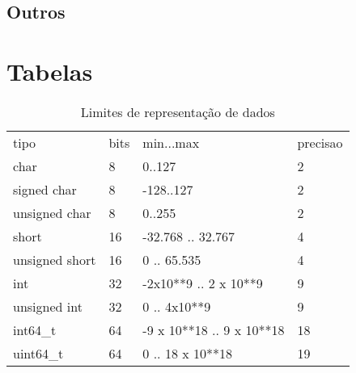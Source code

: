 \documentclass[a4paper,twocolumn, 10pt, landscape]{article}
\begin{document}
\subsection{Outros}








%

\section{Tabelas}



\begin{table}[!h]
\begin{tabular}{llll}
tipo & bits & min...max & precisao \\ 
char & 8 & 0..127 & 2 \\ 
signed char & 8 & -128..127 & 2 \\ 
unsigned char & 8 & 0..255 & 2 \\ 
short & 16 & -32.768 .. 32.767 & 4 \\ 
unsigned short & 16 & 0 .. 65.535 & 4 \\ 
int & 32 & -2x10**9 .. 2 x 10**9 & 9 \\ 
unsigned int & 32 & 0 .. 4x10**9 & 9 \\ 
int64\_t & 64 & -9 x 10**18 .. 9 x 10**18 & 18 \\ 
uint64\_t & 64 & 0 .. 18 x 10**18 & 19
\end{tabular}
\caption{Limites de representação de dados}
\label{limites}
\end{table}
\end{document}
